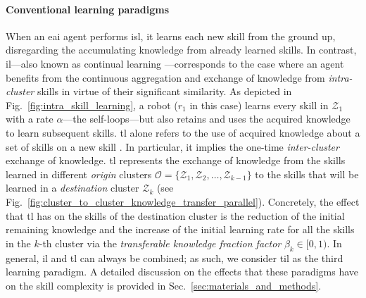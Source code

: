 \documentclass[12pt]{article}
\renewcommand{\emph}[1]{\textit{#1}}
\begin{document}
\paragraph*{Conventional learning paradigms} 
When an \ac{eai} agent performs \ac{isl}, it learns each new skill from the ground up, disregarding the accumulating knowledge from already learned skills. In contrast, \ac{il}---also known as continual learning \cite{Lesort2020Continuallearningrobotics}---corresponds to the case where an agent benefits from the continuous aggregation and exchange of knowledge from \emph{intra-cluster} skills in virtue of their significant similarity. As depicted in Fig.~\ref{fig:intra_skill_learning}, a robot ($r_1$ in this case) learns every skill in $\mathcal{Z}_1$ with a rate $\alpha$---the self-loops---but also retains and uses the acquired knowledge to learn subsequent skills. \Ac{tl} alone refers to the use of acquired knowledge about a set of skills on a new skill \cite{Hosna2022Transferlearningfriendly,Jaquier2023TransferLearningRobotics}. In particular, it implies the one-time \emph{inter-cluster} exchange of knowledge. \Ac{tl} represents the exchange of knowledge from the skills learned in different \emph{origin} clusters $\mathcal{O} = \{ \mathcal{Z}_1,\mathcal{Z}_2,\ldots,\mathcal{Z}_{k-1} \}$ to the skills that will be learned in a \emph{destination} cluster $\mathcal{Z}_k$ (see Fig.~\ref{fig:cluster_to_cluster_knowledge_transfer_parallel}). Concretely, the effect that \ac{tl} has on the skills of the destination cluster is the reduction of the initial remaining knowledge and the increase of the initial learning rate for all the skills in the $k$-th cluster via the \emph{transferable knowledge fraction factor} $\beta_k \in [0,1)$. In general, \ac{il} and \ac{tl} can always be combined; as such, we consider \ac{til} as the third learning paradigm. A detailed discussion on the effects that these paradigms have on the skill complexity is provided in Sec.~\ref{sec:materials_and_methods}.

\end{document}

